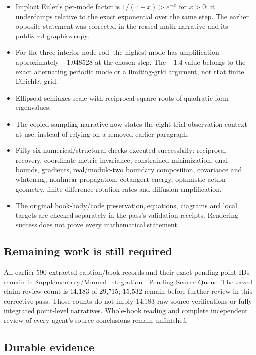 \begin{itemize}
\tightlist
\item
  Implicit Euler's per-mode factor is \(1/(1+x)>e^{-x}\) for \(x>0\): it underdamps relative to the exact exponential over the same step. The earlier opposite statement was corrected in the reused math narrative and its published graphics copy.
\item
  For the three-interior-node rod, the highest mode has amplification approximately \(-1.048528\) at the chosen step. The \(-1.4\) value belongs to the exact alternating periodic mode or a limiting-grid argument, not that finite Dirichlet grid.
\item
  Ellipsoid semiaxes scale with reciprocal square roots of quadratic-form eigenvalues.
\item
  The copied sampling narrative now states the eight-trial observation context at use, instead of relying on a removed earlier paragraph.
\item
  Fifty-six numerical/structural checks executed successfully: reciprocal recovery, coordinate metric invariance, constrained minimization, dual bounds, gradients, real/modulo-two boundary composition, covariance and whitening, nonlinear propagation, cotangent energy, optimistic action geometry, finite-difference rotation rates and diffusion amplification.
\item
  The original book-body/code preservation, equations, diagrams and local targets are checked separately in the pass's validation receipts. Rendering success does not prove every mathematical statement.
\end{itemize}

\subsection{Remaining work is still required}\label{remaining-work-is-still-required}

All earlier 590 extracted caption/book records and their exact pending point IDs remain in \hyperref[appendix-ac1f51db5e9a]{Supplementary/Manual Integration - Pending Source Queue}. The saved claim-review count is 14,183 of 29,715; 15,532 remain before further review in this corrective pass. Those counts do not imply 14,183 raw-source verifications or fully integrated point-level narratives. Whole-book reading and complete independent review of every agent's source conclusions remain unfinished.

\subsection{Durable evidence}\label{durable-evidence}

